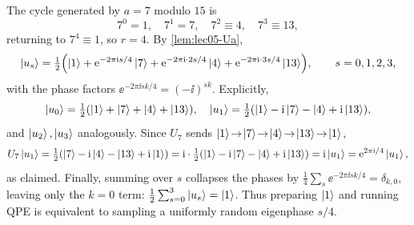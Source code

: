 \begin{solution}
The cycle generated by $a=7$ modulo $15$ is
\[
  7^{0}=1,\quad 7^{1}=7,\quad 7^{2}\equiv4,\quad 7^{3}\equiv13,
\]
returning to $7^{4}\equiv1$, so $r=4$. By \cref{lem:lec05-Ua},
\[
  \ket{u_s}=\tfrac12\Bigl(\ket{1}+\mathrm{e}^{-2\pi\mathrm{i} s/4}\ket{7}
              +\mathrm{e}^{-2\pi\mathrm{i}\cdot 2s/4}\ket{4}
              +\mathrm{e}^{-2\pi\mathrm{i}\cdot 3s/4}\ket{13}\Bigr),
  \qquad s=0,1,2,3,
\]
with the phase factors $\ee^{-2\pi\ii s k/4}=(-\ii)^{sk}$. Explicitly,
\[
  \ket{u_0}=\tfrac12(\ket1+\ket7+\ket4+\ket{13}),\quad
  \ket{u_1}=\tfrac12(\ket1-\mathrm{i}\ket7-\ket4+\mathrm{i}\ket{13}),
\]
and $\ket{u_2},\ket{u_3}$ analogously. Since $U_7$ sends
$\ket1\!\to\!\ket7\!\to\!\ket4\!\to\!\ket{13}\!\to\!\ket1$,
\[
  U_7\ket{u_1}
  =\tfrac12(\ket7-\mathrm{i}\ket4-\ket{13}+\mathrm{i}\ket1)
  =\mathrm{i}\cdot\tfrac12(\ket1-\mathrm{i}\ket7-\ket4+\mathrm{i}\ket{13})
  =\mathrm{i}\ket{u_1}=\mathrm{e}^{2\pi\mathrm{i}/4}\ket{u_1},
\]
as claimed. Finally, summing over $s$ collapses the phases by
$\tfrac14\sum_{s}\ee^{-2\pi\ii sk/4}=\delta_{k,0}$, leaving only the $k=0$ term:
$\tfrac12\sum_{s=0}^{3}\ket{u_s}=\ket{1}$. Thus preparing $\ket1$ and running QPE
is equivalent to sampling a uniformly random eigenphase $s/4$.
\end{solution}
